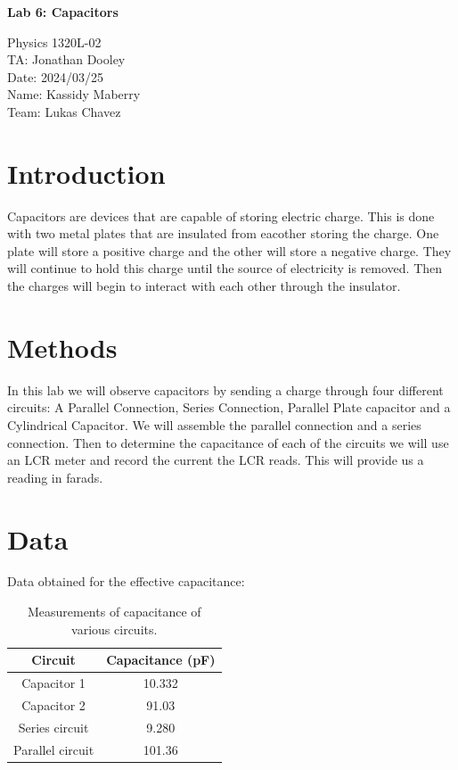 \documentclass[10pt]{article}
\newcommand{\PLtitle}{\setlength{\parindent}{0pt}
\begin{center}

  \huge{\textbf{Lab \Lab: \Ltitle\\}}
  \normalsize 

  Physics 1320L-02 \\
  TA: \TA \\
  Date: \date\\
  Name: \author\\
  
  Team: \team\\


\end{center}
}
\def\Lab{6}
\def\Ltitle{Capacitors}
\def\author{Kassidy Maberry}
\def\team{Lukas Chavez}
\def\TA{Jonathan Dooley}
\def\date{2024/03/25}
\def\tab{\hspace*{10mm}}
\begin{document}
\PLtitle

\section{Introduction}
\tab Capacitors are devices that are capable of storing electric charge. This is done with two metal plates that
are insulated from eacother storing the charge. One plate will store a positive charge and the other will store a negative charge.
They will continue to hold this charge until the source of electricity is removed. Then the charges will begin to interact with each other
through the insulator.


\section{Methods}
\tab In this lab we will observe capacitors by sending a charge through four different circuits: A Parallel Connection, Series Connection, Parallel Plate capacitor and
a Cylindrical Capacitor. We will assemble the parallel connection and a series connection. Then to determine the capacitance of each of the circuits we will use an LCR meter and record the current the LCR reads.
This will provide us a reading in farads.\\

\section{Data}

Data obtained for the effective capacitance:
\begin{table}[!h]\label{Table 1}
  \begin{center}
    \begin{tabular}{|c|c|}
      \hline
      Circuit & Capacitance (pF) \\
      \hline
      Capacitor 1    & 10.332                     \\
      \hline
      Capacitor 2    & 91.03          \\
      \hline
      Series circuit     & 9.280                    \\
      \hline
      Parallel circuit     & 101.36                 \\
      \hline
    \end{tabular}
    \caption[short]{Measurements of capacitance of various circuits.}
  \end{center}
\end{table}
\end{document}
